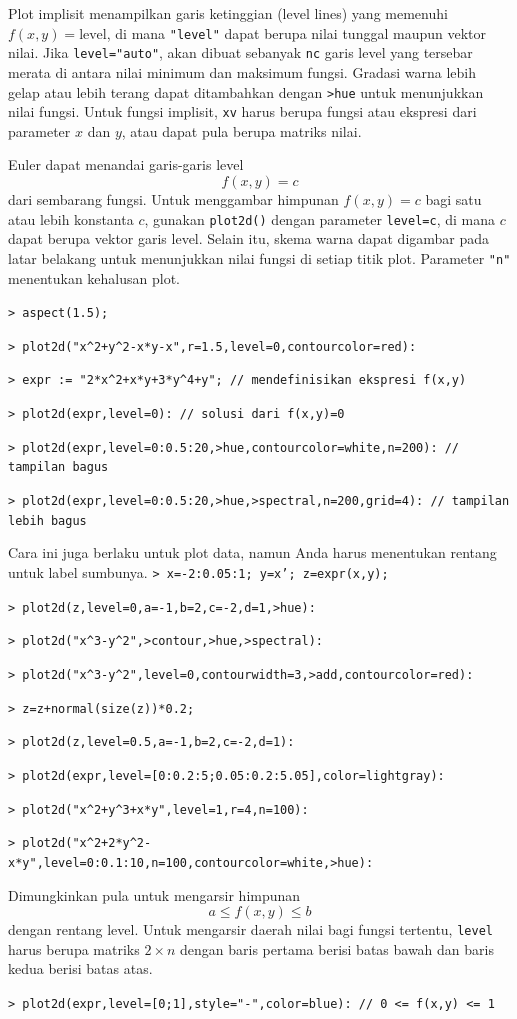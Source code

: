\documentclass[11pt, a4paper]{article}
\newcommand{\emtcmd}[1]{\noindent\texttt{\textcolor{emtcommand}{>}\ #1}\par\smallskip}
\begin{document}
Plot implisit menampilkan garis ketinggian (level lines) yang memenuhi $f(x,y)=\text{level}$, di mana \texttt{"level"} dapat berupa nilai tunggal maupun vektor nilai. Jika \texttt{level="auto"}, akan dibuat sebanyak \texttt{nc} garis level yang tersebar merata di antara nilai minimum dan maksimum fungsi. Gradasi warna lebih gelap atau lebih terang dapat ditambahkan dengan \texttt{>hue} untuk menunjukkan nilai fungsi. Untuk fungsi implisit, \texttt{xv} harus berupa fungsi atau ekspresi dari parameter $x$ dan $y$, atau dapat pula berupa matriks nilai.

Euler dapat menandai garis-garis level
$$f(x,y) = c$$
dari sembarang fungsi. Untuk menggambar himpunan $f(x,y)=c$ bagi satu atau lebih konstanta $c$, gunakan \texttt{plot2d()} dengan parameter \texttt{level=c}, di mana $c$ dapat berupa vektor garis level. Selain itu, skema warna dapat digambar pada latar belakang untuk menunjukkan nilai fungsi di setiap titik plot. Parameter \texttt{"n"} menentukan kehalusan plot.

\emtcmd{aspect(1.5);}
\emtcmd{plot2d("x\^{}2+y\^{}2-x*y-x",r=1.5,level=0,contourcolor=red):}
\emtcmd{expr := "2*x\^{}2+x*y+3*y\^{}4+y"; \textcolor{emtcomment}{// mendefinisikan ekspresi f(x,y)}}
\emtcmd{plot2d(expr,level=0): \textcolor{emtcomment}{// solusi dari f(x,y)=0}}
\emtcmd{plot2d(expr,level=0:0.5:20,>hue,contourcolor=white,n=200): \textcolor{emtcomment}{// tampilan bagus}}
\emtcmd{plot2d(expr,level=0:0.5:20,>hue,>spectral,n=200,grid=4): \textcolor{emtcomment}{// tampilan lebih bagus}}

Cara ini juga berlaku untuk plot data, namun Anda harus menentukan rentang untuk label sumbunya.
\emtcmd{x=-2:0.05:1; y=x'; z=expr(x,y);}
\emtcmd{plot2d(z,level=0,a=-1,b=2,c=-2,d=1,>hue):}
\emtcmd{plot2d("x\^{}3-y\^{}2",>contour,>hue,>spectral):}
\emtcmd{plot2d("x\^{}3-y\^{}2",level=0,contourwidth=3,>add,contourcolor=red):}
\emtcmd{z=z+normal(size(z))*0.2;}
\emtcmd{plot2d(z,level=0.5,a=-1,b=2,c=-2,d=1):}
\emtcmd{plot2d(expr,level=[0:0.2:5;0.05:0.2:5.05],color=lightgray):}
\emtcmd{plot2d("x\^{}2+y\^{}3+x*y",level=1,r=4,n=100):}
\emtcmd{plot2d("x\^{}2+2*y\^{}2-x*y",level=0:0.1:10,n=100,contourcolor=white,>hue):}

Dimungkinkan pula untuk mengarsir himpunan
$$a \le f(x,y) \le b$$
dengan rentang level. Untuk mengarsir daerah nilai bagi fungsi tertentu, \texttt{level} harus berupa matriks $2 \times n$ dengan baris pertama berisi batas bawah dan baris kedua berisi batas atas.

\emtcmd{plot2d(expr,level=[0;1],style="-",color=blue): \textcolor{emtcomment}{// 0 <= f(x,y) <= 1}}
\end{document}
